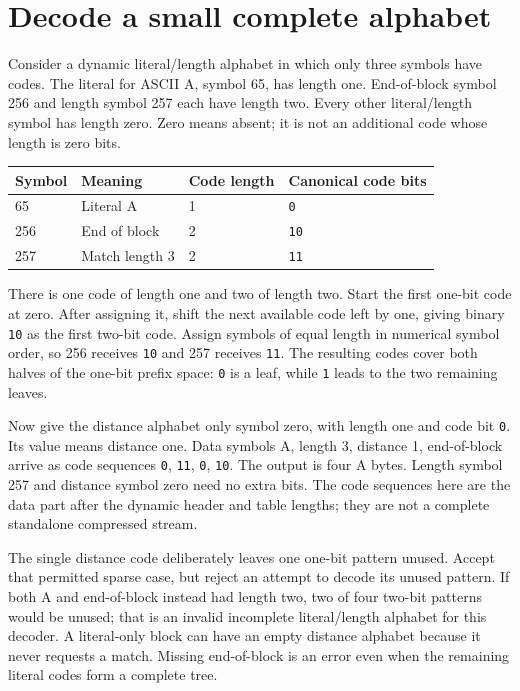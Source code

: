 \section{Decode a small complete alphabet}
Consider a dynamic literal/length alphabet in which only three symbols have codes.
The literal for ASCII A, symbol 65, has length one. End-of-block symbol 256 and length
symbol 257 each have length two. Every other literal/length symbol has length zero.
Zero means absent; it is not an additional code whose length is zero bits.

\begin{longtable}{p{23mm}p{42mm}p{25mm}p{55mm}}
  \toprule Symbol & Meaning        & Code length & Canonical code bits \\\midrule
  65              & Literal A      & 1           & \texttt{0}          \\
  256             & End of block   & 2           & \texttt{10}         \\
  257             & Match length 3 & 2           & \texttt{11}         \\\bottomrule
\end{longtable}
There is one code of length one and two of length two. Start the first one-bit code
at zero. After assigning it, shift the next available code left by one, giving binary
\texttt{10} as the first two-bit code. Assign symbols of equal length in numerical
symbol order, so 256 receives \texttt{10} and 257 receives \texttt{11}. The resulting
codes cover both halves of the one-bit prefix space: \texttt{0} is a leaf, while
\texttt{1} leads to the two remaining leaves.

Now give the distance alphabet only symbol zero, with length one and code bit
\texttt{0}. Its value means distance one. Data symbols A, length 3, distance 1,
end-of-block arrive as code sequences \texttt{0}, \texttt{11}, \texttt{0}, \texttt{10}.
The output is four A bytes. Length symbol 257 and distance symbol zero need no extra
bits. The code sequences here are the data part after the dynamic header and table
lengths; they are not a complete standalone compressed stream.

The single distance code deliberately leaves one one-bit pattern unused. Accept that
permitted sparse case, but reject an attempt to decode its unused pattern. If both A
and end-of-block instead had length two, two of four two-bit patterns would be unused;
that is an invalid incomplete literal/length alphabet for this decoder. A literal-only
block can have an empty distance alphabet because it never requests a match. Missing
end-of-block is an error even when the remaining literal codes form a complete tree.
